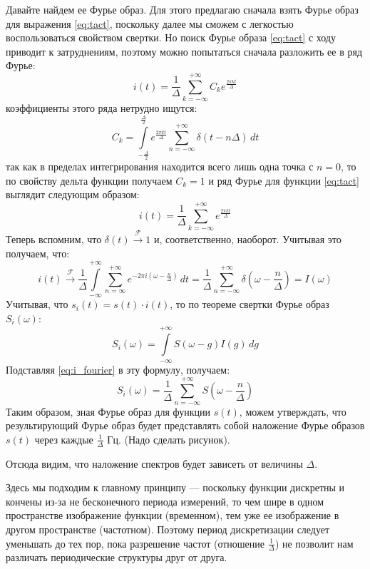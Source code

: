 Давайте найдем ее Фурье образ. Для этого предлагаю сначала взять Фурье образ для выражения \eqref{eq:tact}, поскольку далее мы сможем с легкостью воспользоваться свойством свертки.
Но поиск Фурье образа \eqref{eq:tact} с ходу приводит к затруднениям, поэтому можно попытаться сначала разложить ее в ряд Фурье:
\[i(t) = \frac{1}{\Delta}\sum \limits_{k = -\infty}^{+\infty} C_k e^{\frac{2\pi kt}{\Delta}}\]
коэффициенты этого ряда нетрудно ищутся:
\[C_k = \int \limits_{-\frac{\Delta}{2}}^{\frac{\Delta}{2}}e^{\frac{2\pi kt}{\Delta}}\sum \limits_{n = - \infty}^{+\infty} \delta\left(t - n\Delta\right)\,dt\]
так как в пределах интегрирования находится всего лишь одна точка с $n = 0$, то по свойству дельта функции получаем $C_k = 1$ и ряд Фурье для функции \eqref{eq:tact} выглядит следующим образом:
\begin{equation}
    i(t) = \frac{1}{\Delta}\sum \limits_{k = -\infty}^{+\infty} e^{\frac{2\pi kt}{\Delta}}
    \label{eq:Fourier_series_tact}
\end{equation}
Теперь вспомним, что  $\delta(t)\xrightarrow{\mathscr{F}}1$ и, соответственно, наоборот.
Учитывая это получаем, что:
\begin{equation}
    i(t)  \xrightarrow{\mathscr{F}} \frac{1}{\Delta}\int \limits_{-\infty}^{+\infty} \sum \limits_{n = \infty}^{+\infty} e^{-2\pi i \left(\omega - \frac{n}{\Delta}\right)}\,dt =
    \frac{1}{\Delta}\sum \limits_{n = -\infty}^{+\infty} \delta\left(\omega - \frac{n}{\Delta}\right) = I(\omega)
\label{eq:i_fourier}
\end{equation}
Учитывая, что $s_i(t) = s(t)\cdot i(t)$, то по теореме свертки Фурье образ $S_i(\omega)$:
\[S_i(\omega) = \int \limits_{-\infty}^{+\infty}S(\omega - g) I(g)\,dg\]
Подставляя \eqref{eq:i_fourier} в эту формулу, получаем:
\begin{equation}
    S_i(\omega) = \frac1{\Delta}\sum \limits_{n = -\infty}^{+\infty}S\left(\omega - \frac{n}{\Delta}\right)
\label{eq:Fourier_Si}
\end{equation}
Таким образом, зная Фурье образ для функции $s(t)$, можем утверждать, что результирующий Фурье образ будет представлять собой наложение Фурье образов $s(t)$ через каждые $\frac{1}{\Delta}$ Гц. (Надо сделать рисунок).

Отсюда видим, что наложение спектров будет зависеть от величины $\Delta$. 

Здесь мы подходим к главному принципу --- поскольку функции дискретны и кончены из-за не бесконечного периода измерений, то чем шире в одном пространстве изображение функции (временном), тем уже ее изображение в другом пространстве (частотном). Поэтому период дискретизации следует уменьшать до тех пор, пока разрешение частот (отношение $\frac1{\Delta}$) не позволит нам различать периодические структуры друг от друга.


